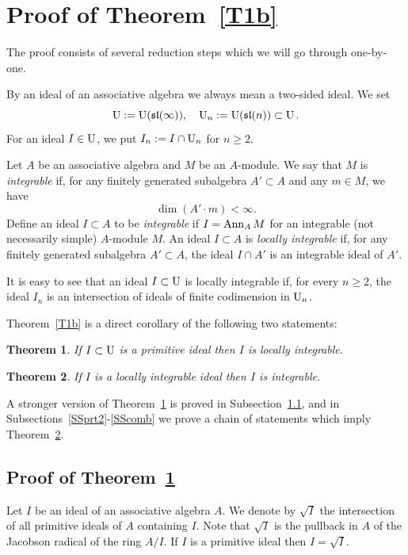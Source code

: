 \documentclass[10pt]{amsart}\oddsidemargin -1mm \evensidemargin -1mm \topmargin -15mm\headheight5mm \headsep 3.5mm \textheight 245mm\textwidth 170mm %
\newtheorem{theorem}{Theorem}[section]\newtheorem{lemma}[theorem]{Lemma}\newtheorem{claim}[theorem]{Claim}\newtheorem{remark}[theorem]{Remark}\newtheorem{proposition}[theorem]{Proposition}\newtheorem{corollary}[theorem]{Corollary}\newtheorem{definition}[theorem]{Definition}\newtheorem{Ex}[theorem]{Example}\newtheorem*{Ex0}{Examples}
\begin{document}
\section{Proof of Theorem~\ref{T1b}}
The proof consists of several reduction steps which we will go through one-by-one.

By an ideal of an associative algebra we always mean a two-sided ideal. We set $$\operatorname{\mathrm{U}}:=\operatorname{\mathrm{U}}(\frak{sl}(\infty)),\hspace{10pt} \operatorname{\mathrm{U}}_n:=\operatorname{\mathrm{U}}(\frak{sl}(n))\subset\operatorname{\mathrm{U}}.$$ For an ideal $I\in\operatorname{\mathrm{U}}$, we put $I_n:=I\cap\operatorname{\mathrm{U}}_n$ for $n\ge2$.

Let $A$ be an associative algebra and $M$ be an $A$-module. We say that $M$ is {\it integrable} if, for any finitely generated subalgebra $A'\subset A$ and any $m\in M$, we have $$\dim (A'\cdot m)<\infty.$$Define an ideal $I\subset A$ to be {\it integrable} if $I=\operatorname{\mathrm{Ann}}_{A}M$ for an integrable (not necessarily simple) $A$-module $M$. 
An ideal $I\subset A$ is {\it locally integrable} if, for any finitely generated subalgebra $A'\subset A$, the ideal $I\cap A'$ is an integrable ideal of $A'$.

It is easy to see that an ideal $I\subset\operatorname{\mathrm{U}}$ is locally integrable if, for every $n\ge2$, the ideal $I_n$ is an intersection of ideals of finite codimension in $\operatorname{\mathrm{U}}_n$.

Theorem~\ref{T1b} is a direct corollary of the following two statements:
\begin{theorem}\label{Tprtolint}If $I\subset\operatorname{\mathrm{U}}$ is a primitive ideal then $I$ is locally integrable.\end{theorem}
\begin{theorem}\label{Tlinttoint} If $I$ is a locally integrable ideal then $I$ is integrable. \end{theorem}
A stronger version of Theorem~\ref{Tprtolint} is proved in Subsection~\ref{SSprt1}, and in Subsections~\ref{SSprt2}-\ref{SScomb} we prove a chain of statements which imply Theorem~\ref{Tlinttoint}.
\subsection{Proof of Theorem~\ref{Tprtolint}}\label{SSprt1}
Let $I$ be an ideal of an associative algebra $A$. We denote by $\sqrt I$ the intersection of all primitive ideals of $A$ containing $I$. Note that $\sqrt I$ is the pullback in $A$ of the Jacobson radical of the ring $A/I$. If $I$ is a primitive ideal then $I=\sqrt I$.
\end{document}

